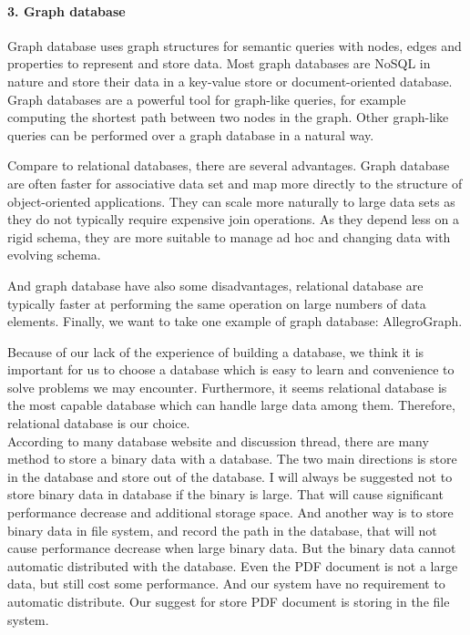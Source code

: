 \paragraph{3. Graph database}
Graph database uses graph structures for semantic queries with nodes,  edges and properties to represent and store data. Most graph databases are NoSQL in nature and store their data in a key-value store or document-oriented database. Graph databases are a powerful tool for graph-like queries, for example computing the shortest path between two nodes in the graph. Other graph-like queries can be performed over a graph database in a natural way.

Compare to relational databases, there are several advantages. Graph database are often faster for associative data set and map more directly to the structure of object-oriented applications. They can scale more naturally to large data sets as they do not typically require expensive join operations. As they depend less on a rigid schema, they are more suitable to manage ad hoc and changing data with evolving schema.

And graph database have also some disadvantages, relational database are typically faster at performing the same operation on large numbers of data elements. Finally, we want to take one example of graph database: AllegroGraph. 

Because of our lack of the experience of building a database, we think it is important for us to choose a database which is easy to learn and convenience to solve problems we may encounter. Furthermore, it seems relational database is the most capable database which can handle large data among them. Therefore, relational database is our choice.\\


According to many database website and discussion thread, there are many method to store a binary data with a database. The two main directions is store in the database and store out of the database. I will always be suggested not to store binary data in database if the binary is large. That will cause significant performance decrease and additional storage space. And another way is to store binary data in file system, and record the path in the database, that will not cause performance decrease when large binary data. But the binary data cannot automatic distributed with the database. Even the PDF document is not a large data, but still cost some performance. And our system have no requirement to automatic distribute. Our suggest for store PDF document is storing in the file system.

